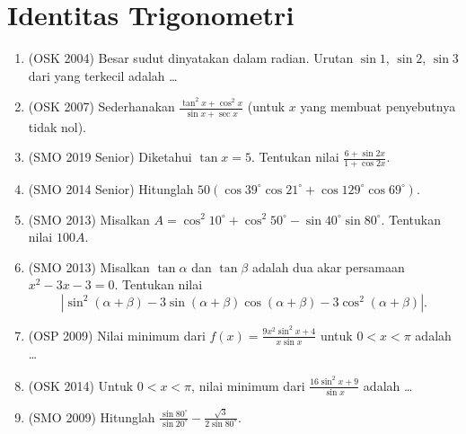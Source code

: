 \documentclass[12pt]{scrartcl}
\begin{document}
\section{Identitas Trigonometri}

\begin{enumerate}

	\item (OSK 2004)
	Besar sudut dinyatakan dalam radian. Urutan $\sin 1$, $\sin 2$, $\sin 3$
	dari yang terkecil adalah \dots

	\item (OSK 2007)
	Sederhanakan $\frac{\tan^{2}x+\cos^{2}x}{\sin x+\sec x}$
	(untuk $x$ yang membuat penyebutnya tidak nol).

	\item (SMO 2019 Senior)
	Diketahui $\tan x = 5$. Tentukan nilai $\frac{6+\sin 2x}{1+\cos 2x}$.

	\item (SMO 2014 Senior)
	Hitunglah $50(\cos 39^{\circ}\cos 21^{\circ}
	+ \cos 129^{\circ}\cos 69^{\circ})$.

	\item (SMO 2013)
	Misalkan $A = \cos^2 10^{\circ} + \cos^2 50^{\circ}
	- \sin 40^{\circ}\sin 80^{\circ}$. Tentukan nilai $100A$.

	\item (SMO 2013)
	Misalkan $\tan\alpha$ dan $\tan\beta$ adalah dua akar persamaan
	$x^2-3x-3 = 0$. Tentukan nilai
	\[ \left|\sin^2(\alpha+\beta) - 3\sin(\alpha+\beta)\cos(\alpha+\beta)
	- 3\cos^2(\alpha+\beta)\right|. \]

	\item (OSP 2009)
	Nilai minimum dari $f(x) = \frac{9x^{2}\sin^{2}x + 4}{x\sin x}$
	untuk $0 < x < \pi$ adalah \dots

	\item (OSK 2014)
	Untuk $0 < x < \pi$, nilai minimum dari
	$\frac{16\sin^2 x + 9}{\sin x}$ adalah \dots

	\item (SMO 2009)
	Hitunglah $\frac{\sin 80^{\circ}}{\sin 20^{\circ}}
	- \frac{\sqrt{3}}{2\sin 80^{\circ}}$.


\end{enumerate}
\end{document}
